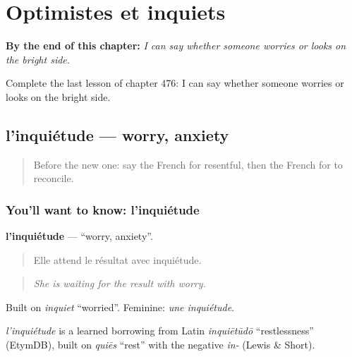 
\chapter{Optimistes et inquiets}
\label{ch:fr-optimistes-et-inquiets}

\begin{chapteropening}
\textbf{By the end of this chapter:} \emph{I can say whether someone worries or looks on the bright side.}

Complete the last lesson of chapter 476: I can say whether someone worries or looks on the bright side.
\end{chapteropening}

\section[l'inquiétude]{l'inquiétude — worry, anxiety}

\label{lesson:FR-C476-inquietude}



\begin{quote}
Before the new one: say the French for resentful, then the French for to reconcile.
\end{quote}

\subsection*{You'll want to know: l'inquiétude}
\textbf{l'inquiétude} — \textquotedblleft{}worry, anxiety\textquotedblright{}.

\begin{quote}
Elle attend le résultat avec inquiétude.
\end{quote}

\begin{quote}
\emph{She is waiting for the result with worry.}
\end{quote}

Built on \emph{inquiet} \textquotedblleft{}worried\textquotedblright{}. Feminine: \emph{une inquiétude}.

\begin{cousinweb}
\emph{l'inquiétude} is a learned borrowing from Latin \emph{inquiētūdō} \textquotedblleft{}restlessness\textquotedblright{} (EtymDB), built on \emph{quiēs} \textquotedblleft{}rest\textquotedblright{} with the negative \emph{in-} (Lewis \& Short).
\end{cousinweb}

